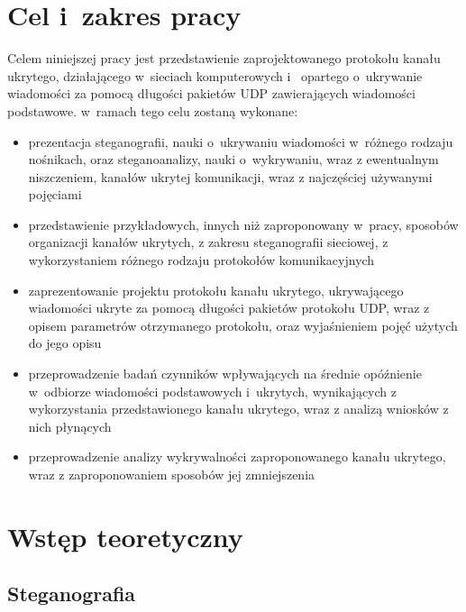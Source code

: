 \documentclass[a4paper, twoside, 12pt]{report}
\begin{document}
\tableofcontents

\listoffigures

\chapter{Cel i~zakres pracy}
    Celem niniejszej pracy jest przedstawienie zaprojektowanego protokołu kanału
    ukrytego, działającego w~sieciach komputerowych i~ opartego o~ukrywanie wiadomości za pomocą długości pakietów UDP
    zawierających wiadomości podstawowe. w~ramach tego celu zostaną wykonane:
    \begin{itemize}
        \item prezentacja steganografii, nauki o~ukrywaniu wiadomości w~różnego rodzaju nośnikach,
            oraz steganoanalizy, nauki o~wykrywaniu, wraz z ewentualnym niszczeniem, kanałów
            ukrytej komunikacji, wraz z najczęściej używanymi pojęciami
        \item przedstawienie przykładowych, innych niż zaproponowany w~pracy,
            sposobów organizacji kanałów ukrytych, z zakresu steganografii sieciowej,
            z wykorzystaniem różnego rodzaju protokołów komunikacyjnych
        \item zaprezentowanie projektu protokołu kanału ukrytego, ukrywającego
            wiadomości ukryte za pomocą długości pakietów protokołu UDP, wraz
            z opisem parametrów otrzymanego protokołu, oraz wyjaśnieniem pojęć
            użytych do jego opisu
        \item przeprowadzenie badań czynników wpływających na średnie opóźnienie
            w~odbiorze wiadomości podstawowych i~ukrytych, wynikających z wykorzystania
            przedstawionego kanału ukrytego, wraz z analizą wniosków
            z nich płynących
        \item przeprowadzenie analizy wykrywalności zaproponowanego kanału ukrytego,
            wraz z zaproponowaniem sposobów jej zmniejszenia
    \end{itemize}

\chapter{Wstęp teoretyczny}
    \section{Steganografia}
\end{document}
